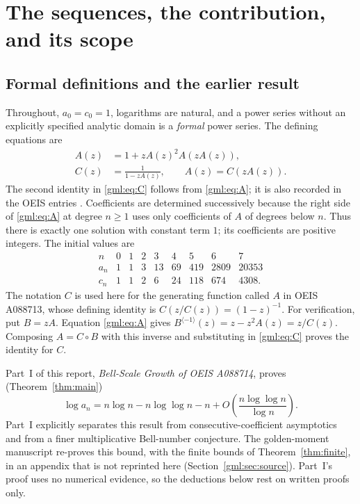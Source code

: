 \documentclass[11pt]{article}
\numberwithin{equation}{section}
\theoremstyle{definition}
\theoremstyle{remark}
\begin{document}
\section{The sequences, the contribution, and its scope}
\subsection{Formal definitions and the earlier result}
Throughout, $a_0=c_0=1$, logarithms are natural, and a power series without
an explicitly specified analytic domain is a \emph{formal} power series.
The defining equations are
\begin{align}
 A(z)&=1+zA(z)^2A(zA(z)),\label{gml:eq:A}\\
 C(z)&=\frac1{1-zA(z)},\qquad A(z)=C(zA(z)).\label{gml:eq:C}
\end{align}
The second identity in \eqref{gml:eq:C} follows from \eqref{gml:eq:A}; it is also
recorded in the OEIS entries \cite{oeis-a088714,oeisC}. Coefficients are determined
successively because the right side of \eqref{gml:eq:A} at degree $n\ge1$
uses only coefficients of $A$ of degrees below $n$. Thus there is exactly
one solution with constant term $1$; its coefficients are positive integers.
The initial values are
\[
\begin{array}{c|rrrrrrrr}
n&0&1&2&3&4&5&6&7\\\hline
a_n&1&1&3&13&69&419&2809&20353\\
c_n&1&1&2&6&24&118&674&4308.
\end{array}
\]
The notation $C$ is used here for the generating function called $A$ in
OEIS A088713, whose defining identity is $C(z/C(z))=(1-z)^{-1}$.
For verification, put $B=zA$. Equation \eqref{gml:eq:A} gives
$B^{\langle-1\rangle}(z)=z-z^2A(z)=z/C(z)$. Composing $A=C\circ B$
with this inverse and substituting in \eqref{gml:eq:C} proves the identity for $C$.

Part~I of this report, \emph{Bell-Scale Growth of OEIS A088714},
proves (Theorem~\ref{thm:main})
\begin{equation}\label{gml:eq:oldgrowth}
 \log a_n=n\log n-n\log\log n-n+
 O\left(\frac{n\log\log n}{\log n}\right).
\end{equation}
Part~I explicitly separates this result from consecutive-coefficient
asymptotics and from a finer multiplicative Bell-number conjecture.
The golden-moment manuscript re-proves this bound, with the finite bounds
of Theorem~\ref{thm:finite}, in an appendix that is not reprinted here
(Section~\ref{gml:sec:source}). Part~I's proof uses no numerical
evidence, so the deductions below rest on written proofs only.
\end{document}

